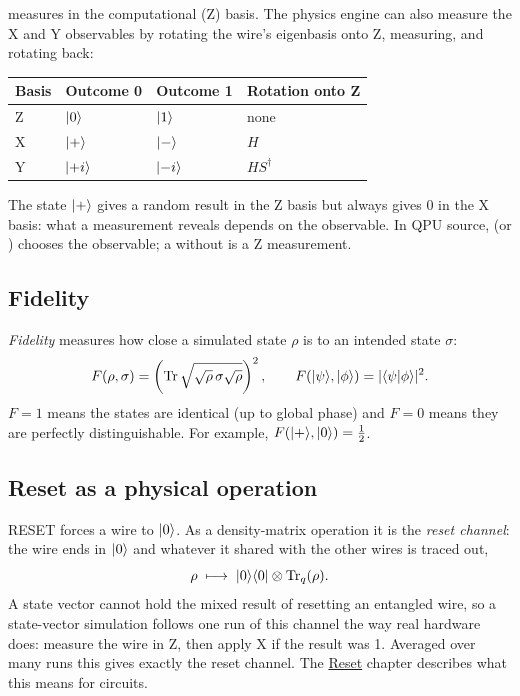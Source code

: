  measures in the computational (Z) basis. The physics engine can
also measure the X and Y observables by rotating the wire's eigenbasis onto Z,
measuring, and rotating back:
\begin{center}
\begin{tabular}{llll}
\toprule
Basis & Outcome 0 & Outcome 1 & Rotation onto Z\\
\midrule
Z & $\lvert 0\rangle$ & $\lvert 1\rangle$ & none\\
X & $\lvert +\rangle$ & $\lvert -\rangle$ & $H$\\
Y & $\lvert +i\rangle$ & $\lvert -i\rangle$ & $HS^\dagger$\\
\bottomrule
\end{tabular}
\end{center}
The state $\lvert +\rangle$ gives a random result in the Z basis but always gives 0 in
the X basis: what a measurement reveals depends on the observable. In QPU
source,  (or ) chooses the observable; a
 without  is a Z measurement.

\subsection{Fidelity}

\emph{Fidelity} measures how close a simulated state $\rho$ is to an intended
state $\sigma$:
\[
F(\rho,\sigma)=\left(\operatorname{Tr}\sqrt{\sqrt\rho\,\sigma\sqrt\rho}\right)^2,
\qquad
F(\lvert \psi\rangle,\lvert \phi\rangle)=|\langle\psi|\phi\rangle|^2 .
\]
$F=1$ means the states are identical (up to global phase) and $F=0$ means they
are perfectly distinguishable. For example, $F(\lvert +\rangle,\lvert 0\rangle)=\tfrac12$.

\subsection{Reset as a physical operation}

RESET forces a wire to $\lvert 0\rangle$. As a density-matrix operation it is the
\emph{reset channel}: the wire ends in $\lvert 0\rangle$ and whatever it shared with the
other wires is traced out,
\[
\rho\;\longmapsto\;\lvert 0\rangle\langle 0\rvert\otimes\operatorname{Tr}_q(\rho).
\]
A state vector cannot hold the mixed result of resetting an entangled wire,
so a state-vector simulation follows one run of this channel the way real
hardware does: measure the wire in Z, then apply X if the result was 1.
Averaged over many runs this gives exactly the reset channel. The
\hyperlink{reset-semantics}{Reset} chapter describes what this means for
circuits.


